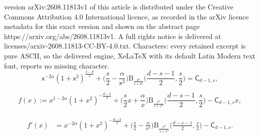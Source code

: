 \documentclass[10pt,a4paper]{amsart}
\begin{document}
version arXiv:2608.11813v1 of this article is distributed under the Creative Commons Attribution 4.0 International licence, as recorded in the arXiv licence metadata for this exact version and shown on the abstract page https://arxiv.org/abs/2608.11813v1. A full rights notice is delivered at licenses/arxiv-2608.11813-CC-BY-4.0.txt. Characters: every retained excerpt is pure ASCII, so the delivered engine, XeLaTeX with its default Latin Modern text font, reports no missing character.
\begin{equation}
\label{eq:critical point incomplete beta}
\mathsf{x}^{-2\alpha}
    (1+\mathsf{x}^2)^{\frac{3-d}{2}}
    +
    \Big(
        \frac{s}{2}
        -
        \frac{\alpha}{\mathsf{x}^2}
    \Big)
    \mathrm{B}_{\frac{\mathsf{x}^2}{1+\mathsf{x}^2}}
    \Big(
        \frac{d-s-1}{2},
        \frac{s}{2}
    \Big)
    =
    \mathsf{C}_{d-1,s},
\end{equation}

\begin{equation}\label{def:f(x)}
    f(x) := x^{1-2\alpha}(1+x^2)^{-\frac{d-3}{2}} +\Big(\frac{s}{2}x +\frac{\alpha}{x}\Big) \mathrm{B}_{\frac{x^2}{1+x^2}}\Big(\frac{d-s-1}{2}, \frac{s}{2}\Big)-\mathsf{C}_{d-1, s}x, 
\end{equation}

\begin{align}
\label{eq:f'(x)}
\begin{split}
    f'(x) 
    &= x^{-2\alpha}(1+x^2)^{-\frac{d-3}{2}} + \Big(\frac{s}{2}-\frac{\alpha}{x^2}\Big)\mathrm{B}_{\frac{x^2}{1+x^2}}\Big(\frac{d-s-1}{2},\frac{s}{2}\Big)-\mathsf{C}_{d-1,s}.
\end{split}
\end{align}
\end{document}

